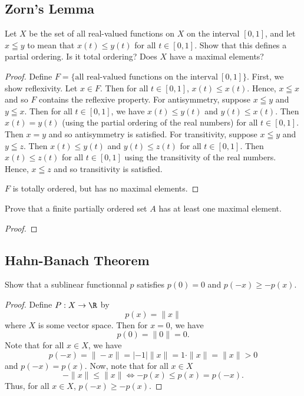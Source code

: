\subsection{Zorn's Lemma}

\begin{problem}[4.1.2]
    Let \( X  \) be the set of all real-valued functions on \( X  \) on the interval \( [0,1] \), and let \( x \leqq y  \) to mean that \( x(t) \leq y(t) \) for all \( t \in [0,1] \). Show that this defines a partial ordering. Is it total ordering? Does \( X  \) have a maximal elements? 
\end{problem}
\begin{proof}
    Define \( F = \{  \text{all real-valued functions on the interval} \ [0,1] \}  \). First, we show reflexivity. Let \( x \in F  \). Then for all \( t \in [0,1] \), \( x(t) \leq x(t) \). Hence, \( x \leqq x   \) and so \( F  \) contains the reflexive property. For antisymmetry, suppose \( x \leqq y  \) and \( y \leqq x  \). Then for all \( t \in [0,1] \), we have \( x(t) \leq y(t) \) and \( y(t) \leq x(t) \). Then \( x(t) = y(t)  \) (using the partial ordering of the real numbers) for all \( t \in [0,1] \). Then \( x = y  \) and so antisymmetry is satisfied. For transitivity, suppose \( x \leqq y  \) and \( y \leqq z  \). Then \( x(t) \leq y(t) \) and \( y(t) \leq z(t) \) for all \( t \in [0,1] \). Then \( x(t) \leq z(t) \) for all \( t \in [0,1] \) using the transitivity of the real numbers. Hence, \( x \leqq z  \) and so transitivity is satisfied.

    \( F  \) is totally ordered, but has no maximal elements.
\end{proof}

\begin{problem}[4.1.5]
   Prove that a finite partially ordered set \( A  \) has at least one maximal element. 
\end{problem}
\begin{proof}

\end{proof}

\subsection{Hahn-Banach Theorem}

\begin{problem}
    Show that a sublinear functionnal \( p  \) satisfies \( p(0) = 0  \) and \( p(-x) \geq  -p(x)  \).
\end{problem}
\begin{proof}
Define \( P : X \to \R  \) by 
\[  p(x) = \|x\| \]
where \( X  \) is some vector space. Then for \( x = 0  \), we have 
\[  p(0) = \|0\| = 0.  \]
Note that for all \( x \in X  \), we have 
\[  p(-x) = \|-x\| = | -1 | \|x\| = 1 \cdot \|x\| = \|x\| > 0  \]
and \( p(-x) = p(x) \). Now, note that for all \( x \in X  \)
\[  -\|x \| \leq \|x\| \iff -p(x) \leq p(x) = p(-x). \]
Thus, for all \( x \in X  \), \( p(-x) \geq -p(x) \).
\end{proof}

